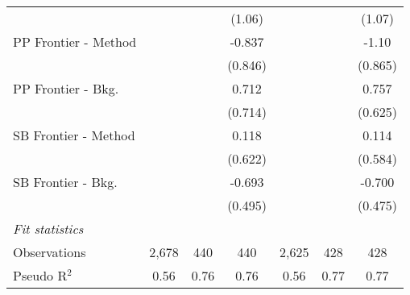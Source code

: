 \begin{tabular}{lcccccc}
                        &         &                & (1.06)         &         &                & (1.07)\\   
   PP Frontier - Method &         &                & -0.837         &         &                & -1.10\\   
                        &         &                & (0.846)        &         &                & (0.865)\\   
   PP Frontier - Bkg.   &         &                & 0.712          &         &                & 0.757\\   
                        &         &                & (0.714)        &         &                & (0.625)\\   
   SB Frontier - Method &         &                & 0.118          &         &                & 0.114\\   
                        &         &                & (0.622)        &         &                & (0.584)\\   
   SB Frontier - Bkg.   &         &                & -0.693         &         &                & -0.700\\   
                        &         &                & (0.495)        &         &                & (0.475)\\   
   \midrule
   \emph{Fit statistics}\\
   Observations         & 2,678   & 440            & 440            & 2,625   & 428            & 428\\  
   Pseudo R$^2$         & 0.56    & 0.76           & 0.76           & 0.56    & 0.77           & 0.77\\  
   

\end{tabular}
